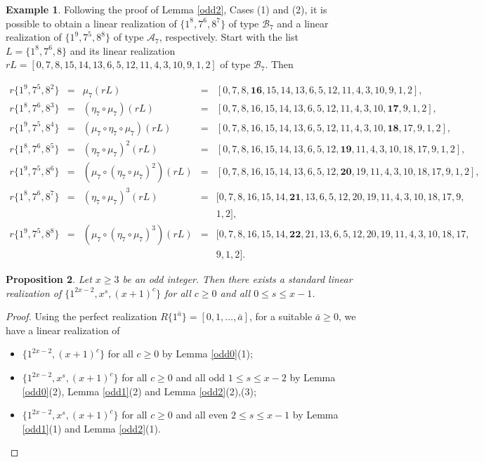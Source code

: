 \documentclass{amsart}
\newtheorem{prop}{Proposition}[section]
\theoremstyle{definition}
\newtheorem{ex}[prop]{Example}
\numberwithin{equation}{section}
\def\A{\mathcal{A}}
\def\B{\mathcal{B}}
\begin{document}
\begin{ex}
Following the proof of Lemma \ref{odd2}, Cases (1) and (2), it is possible to obtain a
linear realization  of $\{1^{8},7^6,8^7\}$ of  type $\B_7$ and
a linear realization of $\{1^{9},7^5,8^8\}$ of type $\A_7$, respectively.
Start with the list $L=\{1^8,7^6,8\}$ and its linear realization
$rL=[0,7,8,15,14,13,6,5,12,11,4,3,10,9,1,2]$  of type $\B_7$. Then

\begin{footnotesize}
$$\begin{array}{rcccl}
r\{1^9,7^5,8^2\} & = & \mu_7(rL) & =& [0,7,8,\bm{16},15,14,13,6,5,12,11,4,3,10,9,1,2], \\
r\{1^8,7^6,8^3\} & = & (\eta_7\circ\mu_7)(rL) & =& [0,7,8,16,15,14,13,6,5,12,11,4,3,10,\bm{17},9,1,2], \\
r\{1^9,7^5,8^4\} & = & (\mu_7\circ\eta_7\circ\mu_7)(rL) & =& [0,7,8,16,15,14,13,6,5,12,11,4,3,10,\bm{18},17,9,1,2], \\
r\{1^8,7^6,8^5\} & = & (\eta_7\circ\mu_7)^2(rL) & =& [0,7,8,16,15,14,13,6,5,12,\bm{19},11,4,3,10,18,17,9,1,2], \\
r\{1^9,7^5,8^6\} & = & (\mu_7\circ(\eta_7\circ\mu_7)^2)(rL) & =&
[0,7,8,16,15,14,13,6,5,12,\bm{20},19,11,4,3,10,18,17,9,1,2], \\
r\{1^8,7^6,8^7\} & = & (\eta_7\circ\mu_7)^3(rL) & =&  [0,7,8,16,15,14,\bm{21},13,6,5,12,20,19,11,4,3,10,18,17,9,\\
&&&&1,2], \\
r\{1^9,7^5,8^8\} & = & (\mu_7\circ(\eta_7\circ\mu_7)^3)(rL) & =&
[0,7,8,16,15,14,\bm{22},21,13,6,5,12,20,19,11,4,3,10,18,17,\\
&&&& 9,1,2] .
\end{array}$$
\end{footnotesize}
\end{ex}


\begin{prop}\label{cor:odd}
Let $x\geq 3$ be an odd integer. Then there exists a standard linear realization of $\{1^{2x-2}, x^s, (x+1)^c\}$
for all $c\geq 0$ and all $0\leq s\leq x-1$.
\end{prop}

\begin{proof}
Using the perfect realization $R\{1^{\bar a} \}=[0,1,\ldots,\bar a]$, for a suitable $\bar a\geq 0$, we have a linear realization of
\begin{itemize}
\item[(1)] $\{1^{2x-2}, (x+1)^c \}$ for all $c\geq 0$ by Lemma \ref{odd0}(1);
\item[(2)] $\{1^{2x-2}, x^s, (x+1)^c \}$ for all $c\geq 0$  and all odd $1\leq s\leq x-2$ by Lemma \ref{odd0}(2), Lemma
\ref{odd1}(2)
and Lemma \ref{odd2}(2),(3);
\item[(3)] $\{1^{2x-2}, x^s, (x+1)^c \}$ for all $c\geq 0$  and all even  $2\leq s\leq x-1$ by Lemma
\ref{odd1}(1) and Lemma \ref{odd2}(1).
\end{itemize}
\end{proof}
\end{document}
